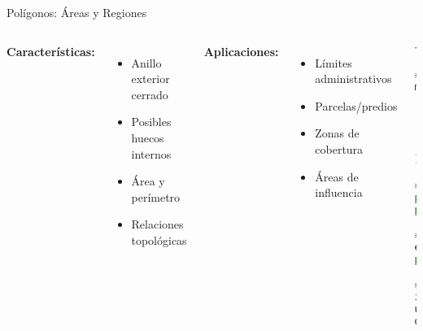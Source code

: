 \documentclass[10pt]{beamer}
\begin{document}
\begin{frame}[fragile]{Polígonos: Áreas y Regiones}
    \begin{columns}
        \textbf{Características:}
        \begin{itemize}
            \item Anillo exterior cerrado
            \item Posibles huecos internos
            \item Área y perímetro
            \item Relaciones topológicas
        \end{itemize}
        
        \textbf{Aplicaciones:}
        \begin{itemize}
            \item Límites administrativos
            \item Parcelas/predios
            \item Zonas de cobertura
            \item Áreas de influencia
        \end{itemize}
        
        \begin{lstlisting}[language=Python, caption=Polígonos y análisis]
from shapely.geometry import Polygon

# Crear polígono
manzana = Polygon([
    (-70.650, -33.440),
    (-70.648, -33.440),
    (-70.648, -33.438),
    (-70.650, -33.438),
    (-70.650, -33.440)
])

# Propiedades geométricas
print(f"Area: {manzana.area}")
print(f"Perimetro: {manzana.length}")

# Operaciones espaciales
edificio = Point(-70.649, -33.439)
print(manzana.contains(edificio))  # True

# Overlay de polígonos
interseccion = poligono1.intersection(poligono2)
union = poligono1.union(poligono2)
diferencia = poligono1.difference(poligono2)
        \end{lstlisting}
    \end{columns}
\end{frame}
\end{document}
